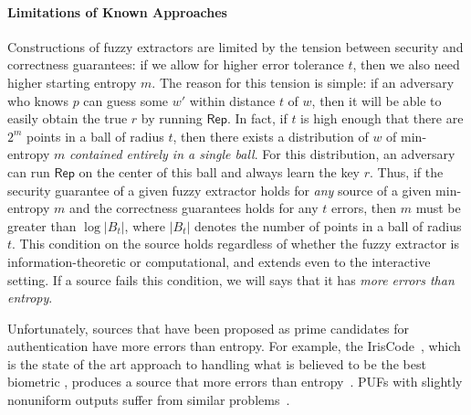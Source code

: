 \documentclass[11pt]{article}
\newcommand{\class}[1]{{\ensuremath{\mathsf{#1}}}}
\newcommand{\rep}{\ensuremath{\class{Rep}}\xspace}
\newcommand{\Huse}{\mathrm{H}_{\mathtt{usable}}}
\begin{document}
\paragraph{Limitations of Known Approaches}

Constructions of fuzzy extractors are limited by the tension between security and correctness guarantees: if we allow for higher error tolerance $t$, then we also need higher starting entropy $m$. The reason for this tension is simple: if an adversary who knows $p$ can guess some $w'$ within distance $t$ of $w$, then it will be able to easily obtain the true $r$ by running $\rep$.
In fact, if $t$ is high enough that there are $2^m$ points in a ball of radius $t$, then there exists a distribution of $w$ of min-entropy $m$  \emph{contained entirely in a single ball}.  For this distribution, an adversary can run $\rep$ on the center of this ball and always learn the key $r$.
Thus, if the security guarantee of a given fuzzy extractor holds for \emph{any} source of a given min-entropy $m$ and the correctness guarantees holds for any $t$ errors, then $m$ must   be greater than $\log |B_t|$, where $|B_t|$ denotes the number of points in a ball of radius $t$.  This condition on the source holds regardless of whether the fuzzy extractor is information-theoretic or computational, and extends even to the interactive setting.
If a source fails this condition, we will says that it has \emph{more errors than entropy}.




Unfortunately, sources that have been proposed as prime candidates for authentication have more errors than entropy.
For example, the IrisCode~\cite{daugman2004}, which is the state of the art approach to handling what is believed to be the best biometric \cite{prabhakar2003biometric}, produces a source that more errors than entropy~\cite[Section 5]{blanton2009biometric}. PUFs with slightly nonuniform outputs suffer from similar problems~\cite{koeberl2014entropy}.
\end{document}
